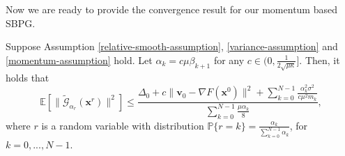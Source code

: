 \documentclass[twoside,11pt]{article}
\newcommand{\E}{\mathbb{E}}
\def\vv{{\bm{v}}}
\def\vx{{\bm{x}}}
\begin{document}
Now we are ready to provide the convergence result for our momentum based SBPG. 
\begin{theorem}
Suppose Assumption \ref{relative-smooth-assumption}, \ref{variance-assumption} and \ref{momentum-assumption} hold. Let $\alpha_k=c\mu\beta_{k+1}$ for any $c\in(0,\frac{1}{2\sqrt{\mu\kappa}}]$. Then, it holds that
\begin{equation}
\E[\|\widetilde{\mathcal G}_{\alpha_r}(\vx^{r})\|^2]\leq\frac{\Delta_0+c\|\vv_0-\nabla F(\vx^0)\|^2+\sum_{k=0}^{N-1}\frac{\alpha_k^2\sigma^2}{c\mu^2m_k}}{\sum_{k=0}^{N-1}\frac{\mu\alpha_k}{8}},
\label{eq:rate-MSBPG}
\end{equation}
where $r$ is a random variable with distribution $\mathbb{P}\{r=k\}=\frac{\alpha_k}{\sum_{k=0}^{N-1}\alpha_k}$, for $k=0,...,N-1$.
\label{momentum-convergence-thm}
\end{theorem}
\end{document}
